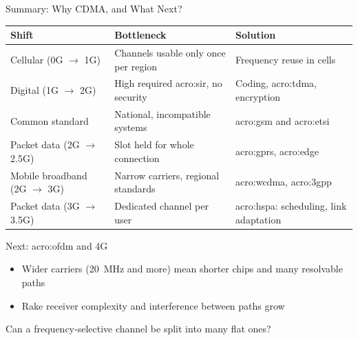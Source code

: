\begin{frame}{Summary: Why CDMA, and What Next?}
  \centering
  \footnotesize
  \begin{tabular}{lll}
    \toprule
    \textbf{Shift} & \textbf{Bottleneck} & \textbf{Solution} \\
    \midrule
    Cellular (0G $\rightarrow$ 1G) & Channels usable only once per region & Frequency reuse in cells \\
    Digital (1G $\rightarrow$ 2G) & High required \acrshort{acro:sir}, no security & Coding, \acrshort{acro:tdma}, encryption \\
    Common standard & National, incompatible systems & \acrshort{acro:gsm} and \acrshort{acro:etsi} \\
    Packet data (2G $\rightarrow$ 2.5G) & Slot held for whole connection & \acrshort{acro:gprs}, \acrshort{acro:edge} \\
    Mobile broadband (2G $\rightarrow$ 3G) & Narrow carriers, regional standards & \acrshort{acro:wcdma}, \acrshort{acro:3gpp} \\
    Packet data (3G $\rightarrow$ 3.5G) & Dedicated channel per user & \acrshort{acro:hspa}: scheduling, link adaptation \\
    \bottomrule
  \end{tabular}

  \normalsize
  \vspace{1em}
  \begin{block}{Next: \gls{acro:ofdm} and 4G}
    \begin{itemize}
      \item Wider carriers (\qty{20}{\mega\hertz} and more) mean shorter chips and many resolvable paths
      \item Rake receiver complexity and interference between paths grow
    \end{itemize}
    Can a frequency-selective channel be split into many flat ones?
  \end{block}
\end{frame}
